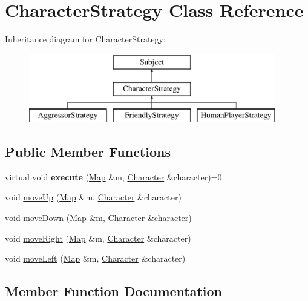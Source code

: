 \hypertarget{class_character_strategy}{}\section{Character\+Strategy Class Reference}
\label{class_character_strategy}
Inheritance diagram for Character\+Strategy\+:\begin{figure}[H]
\begin{center}
\leavevmode
\includegraphics[height=3.000000cm]{class_character_strategy}
\end{center}
\end{figure}
\subsection*{Public Member Functions}
\begin{DoxyCompactItemize}
\item 
\hypertarget{class_character_strategy_a305432efab5617343be685494353a2a7}{}\label{class_character_strategy_a305432efab5617343be685494353a2a7} 
virtual void {\bfseries execute} (\hyperlink{class_map}{Map} \&m, \hyperlink{class_character}{Character} \&character)=0
\item 
void \hyperlink{class_character_strategy_a948e1af0959379f6df4b4abf5714bdcb}{move\+Up} (\hyperlink{class_map}{Map} \&m, \hyperlink{class_character}{Character} \&character)
\item 
void \hyperlink{class_character_strategy_ab4c380f62b3af3ed3b6537e972683185}{move\+Down} (\hyperlink{class_map}{Map} \&m, \hyperlink{class_character}{Character} \&character)
\item 
void \hyperlink{class_character_strategy_ae669d1f7dbfc7bdad6b1a1e26363d5dc}{move\+Right} (\hyperlink{class_map}{Map} \&m, \hyperlink{class_character}{Character} \&character)
\item 
void \hyperlink{class_character_strategy_a51452280934c3abbcd0c2c94b90f54c6}{move\+Left} (\hyperlink{class_map}{Map} \&m, \hyperlink{class_character}{Character} \&character)
\end{DoxyCompactItemize}


\subsection{Member Function Documentation}
\hypertarget{class_character_strategy_ab4c380f62b3af3ed3b6537e972683185}{}\label{class_character_strategy_ab4c380f62b3af3ed3b6537e972683185} 
